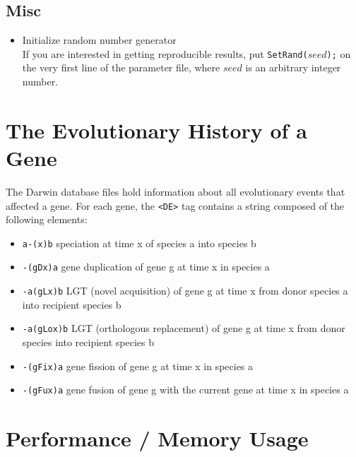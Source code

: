 \documentclass[11pt]{article}
\begin{document}
\subsection{Misc}
\begin{itemize}
\item{Initialize random number generator} \hfill \\
If you are interested in getting reproducible results, put \texttt{SetRand(}$seed$\texttt{);} on the very first line of the parameter file, where $seed$ is an arbitrary integer number.
\end{itemize}

\section{The Evolutionary History of a Gene}
The Darwin database files hold information about all evolutionary events that affected a gene. For each gene, the \texttt{<DE>} tag contains a string composed of the following elements:
\begin{itemize}
\item{\texttt{a-(x)b}} speciation at time x of species a into species b
\item{\texttt{-(gDx)a}} gene duplication of gene g at time x in species a
\item{\texttt{-a(gLx)b}} LGT (novel acquisition) of gene g at time x from donor species a into recipient species b
\item{\texttt{-a(gLox)b}} LGT (orthologous replacement) of gene g at time x from donor species into recipient species b
\item{\texttt{-(gFix)a}} gene fission of gene g at time x in species a
\item{\texttt{-(gFux)a}} gene fusion of gene g with the current gene at time x in species a
\end{itemize}

\section{Performance / Memory Usage}
\end{document}
